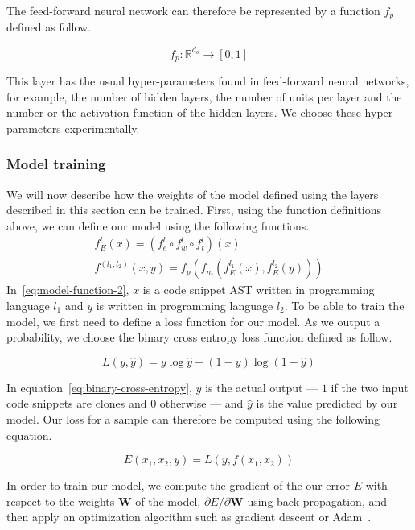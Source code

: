 The feed-forward neural network can therefore be represented by a function $f_p$
defined as follow.

\begin{equation}
  \label{eq:feed-forward}
  f_p : \mathbb{R}^{d_o} \rightarrow [0, 1]
\end{equation}

This layer has the usual hyper-parameters found in feed-forward neural networks,
for example, the number of hidden layers, the number of units per layer and the
number or the activation function of the hidden layers. We choose these
hyper-parameters experimentally.
\subsubsection{Model training}
We will now describe how the weights of the model defined using the layers
described in this section can be trained. First, using the function definitions
above, we can define our model using the following functions.
\begin{align}
  \label{eq:model-function-1}
  f_E^l(x) = (f_e^l \circ f_w^l \circ f_t^l)(x)\\
  \label{eq:model-function-2}
  f^{(l_1, l_2)}(x, y) = f_p\left( f_m\left( f_E^{l_1}(x), f_E^{l_2}(y) \right) \right)
\end{align}
In~\ref{eq:model-function-2}, $x$ is a code snippet AST written in programming
language $l_1$ and $y$ is written in programming language $l_2$. To be able to
train the model, we first need to define a loss function for our model. As we
output a probability, we choose the binary cross entropy loss function defined
as follow.

\begin{equation}
  \label{eq:binary-cross-entropy}
  L(y, \hat{y}) = y\log \hat{y} + (1 - y) \log(1 - \hat{y})
\end{equation}

In equation~\ref{eq:binary-cross-entropy}, $y$ is the actual output --- $1$ if
the two input code snippets are clones and $0$ otherwise --- and $\hat{y}$ is
the value predicted by our model. Our loss for a sample can therefore be
computed using the following equation.

\begin{equation}
  E(x_1, x_2, y) = L(y, f(x_1, x_2))
\end{equation}

In order to train our model, we compute the gradient of the our error $E$ with
respect to the weights $\mathbf{W}$ of the model,
$\partial E/\partial\mathbf{W}$ using back-propagation, and then apply an
optimization algorithm such as gradient descent or
Adam~\cite{DBLP:journals/corr/KingmaB14}.

